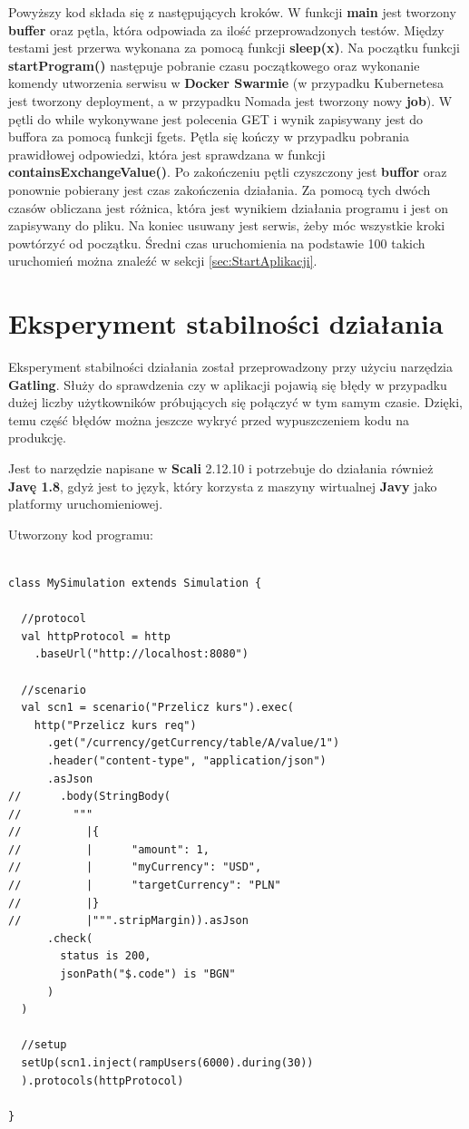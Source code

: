 \documentclass{iiuwb}
\begin{document}
Powyższy kod składa się z następujących kroków. W funkcji \textbf{main} jest tworzony \textbf{buffer} oraz pętla, która odpowiada za ilość przeprowadzonych testów. Między testami jest przerwa wykonana za pomocą funkcji \textbf{sleep(x)}. Na początku funkcji \textbf{startProgram()} następuje pobranie czasu początkowego oraz wykonanie komendy utworzenia serwisu w \textbf{Docker Swarmie} (w przypadku Kubernetesa jest tworzony deployment, a w przypadku Nomada jest tworzony nowy \textbf{job}). W pętli do while wykonywane jest polecenia GET i wynik zapisywany jest do buffora za pomocą funkcji fgets. Pętla się kończy w przypadku pobrania prawidłowej odpowiedzi, która jest sprawdzana w funkcji \textbf{containsExchangeValue()}. Po zakończeniu pętli czyszczony jest \textbf{buffor} oraz ponownie pobierany jest czas zakończenia działania. Za pomocą tych dwóch czasów obliczana jest różnica, która jest wynikiem działania programu i jest on zapisywany do pliku. Na koniec usuwany jest serwis, żeby móc wszystkie kroki powtórzyć od początku. Średni czas uruchomienia na podstawie 100 takich uruchomień można znaleźć w sekcji \ref{sec:StartAplikacji}.

\section{Eksperyment stabilności działania}

Eksperyment stabilności działania został przeprowadzony przy użyciu narzędzia \textbf{Gatling}. Służy do sprawdzenia czy w aplikacji pojawią się błędy w przypadku dużej liczby użytkowników próbujących się połączyć w tym samym czasie. Dzięki, temu część błędów można jeszcze wykryć przed wypuszczeniem kodu na produkcję.

Jest to narzędzie napisane w \textbf{Scali} 2.12.10 i potrzebuje do działania również \textbf{Javę 1.8}, gdyż jest to język, który korzysta z maszyny wirtualnej \textbf{Javy} jako platformy uruchomieniowej.

Utworzony kod programu: 

\begin{lstlisting}[breaklines=true]

class MySimulation extends Simulation {

  //protocol
  val httpProtocol = http
    .baseUrl("http://localhost:8080")

  //scenario
  val scn1 = scenario("Przelicz kurs").exec(
    http("Przelicz kurs req")
      .get("/currency/getCurrency/table/A/value/1")
      .header("content-type", "application/json")
      .asJson
//      .body(StringBody(
//        """
//          |{
//          |      "amount": 1,
//          |      "myCurrency": "USD",
//          |      "targetCurrency": "PLN"
//          |}
//          |""".stripMargin)).asJson
      .check(
        status is 200,
        jsonPath("$.code") is "BGN"
      )
  )

  //setup
  setUp(scn1.inject(rampUsers(6000).during(30))
  ).protocols(httpProtocol)

}

\end{lstlisting}
\end{document}
